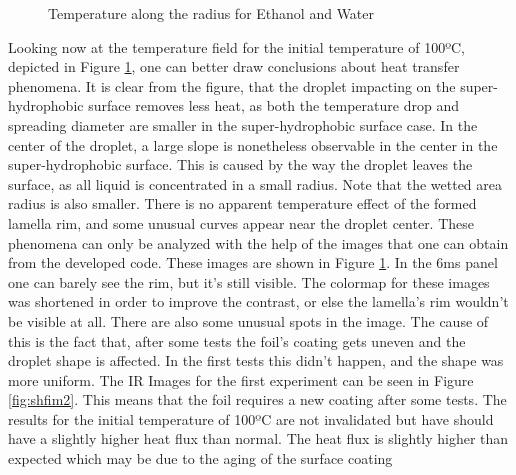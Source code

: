 \begin{figure}[h!]
\centering
\subfigure[2 ms]{}
\subfigure[6 ms]{}
\subfigure[12 ms]{}
\subfigure[24 ms]{}
\caption{Temperature along the radius for Ethanol and Water}
\label{fig:shftemp}
\end{figure}

\par Looking now at the temperature field for the initial temperature of 100ºC, depicted in Figure \ref{fig:shftemp}, one can better draw conclusions about heat transfer phenomena. It is clear from the figure, that the droplet impacting on the super-hydrophobic surface removes less heat, as both the temperature drop and spreading diameter are smaller in the super-hydrophobic surface case. In the center of the droplet, a large slope is nonetheless observable in the center in the super-hydrophobic surface. This is caused by the way the droplet leaves the surface, as all liquid is concentrated in a small radius. Note that the wetted area radius is also smaller. There is no apparent temperature effect of the formed lamella rim, and some unusual curves appear near the droplet center. These phenomena can only be analyzed with the help of the images that one can obtain from the developed code. These images are shown in Figure \ref{fig:shftemp}. In the 6ms panel one can barely see the rim, but it's still visible. The colormap for these images was shortened in order to improve the contrast, or else the lamella's rim wouldn't be visible at all. There are also some unusual spots in the image. The cause of this is the fact that, after some tests the foil's coating gets uneven and the droplet shape is affected. In the first tests this didn't happen, and the shape was more uniform. The IR Images for the first experiment can be seen in Figure \ref{fig:shfim2}. This means that the foil requires a new coating after some tests. The results for the initial temperature of 100ºC are not invalidated but have should have a slightly higher heat flux than normal. The heat flux is slightly higher than expected which may be due to the aging of the surface coating \\

